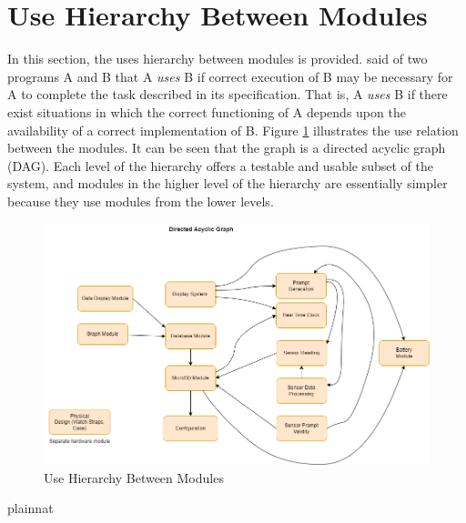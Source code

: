 \documentclass[12pt, titlepage]{article}
\begin{document}
\newpage

\section{Use Hierarchy Between Modules} \label{SecUse}

In this section, the uses hierarchy between modules is
provided. \citet{Parnas1978} said of two programs A and B that A {\em uses} B if
correct execution of B may be necessary for A to complete the task described in
its specification. That is, A {\em uses} B if there exist situations in which
the correct functioning of A depends upon the availability of a correct
implementation of B.  Figure \ref{FigUH} illustrates the use relation between
the modules. It can be seen that the graph is a directed acyclic graph
(DAG). Each level of the hierarchy offers a testable and usable subset of the
system, and modules in the higher level of the hierarchy are essentially simpler
because they use modules from the lower levels.

\begin{figure}[H]
  \centering
\includegraphics[width=\textwidth]{DAG.png}
  \caption{Use Hierarchy Between Modules}
  \label{FigUH}
\end{figure}

\newpage
 {plainnat}

\end{document}
